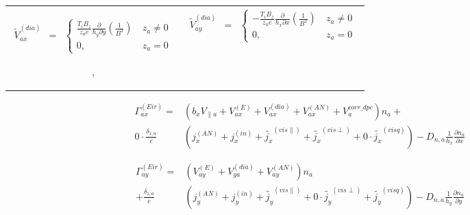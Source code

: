 \documentclass[a4paper,10pt]{report}
\begin{document}
\begin{tabular}{cc}
$\begin{matrix}
\widetilde{V}_{ax}^{(dia)} & =
& \left\{
\begin{matrix}
\frac{T_i B_z}{z_a e} \frac{\partial}{h_y \partial y} \left( \frac{1}{B^2} \right) & \ z_a \neq 0 \\
0, & \ z_a = 0
\end{matrix} \right.
\end{matrix}$

,&

$\begin{matrix}
\widetilde{V}_{ay}^{(dia)} & =
& \left\{
\begin{matrix}
-\frac{T_i B_z}{z_a e} \frac{\partial}{h_x \partial x} \left( \frac{1}{B^2} \right) & \ z_a \neq 0 \\
0, & \ z_a = 0
\end{matrix} \right.
\end{matrix}$
\end{tabular}

\begin{equation}
\begin{matrix}
\Gamma_{ax}^{\left( Eir \right)} =& \left( b_x V_{\parallel a} + V_{ax}^{\left( E \right)} + V_{ax}^{\left( dia \right)} + V_{ax}^{\left( AN \right)} + V_a^{corr\_dpc} \right) n_a + \\
0 \cdot \frac{\delta_{1,a}}{e} & \left( j_x^{\left( AN \right)} + j_x^{\left( in \right)} + \widetilde{j_x}^{\left( vis \parallel \right)} + \widetilde{j_x}^{\left( vis \perp \right)} + 0 \cdot \widetilde{j_x}^{\left( visq \right)} \right) - D_{n,a} \frac{1}{h_x} \frac{\partial n_a}{\partial x}
\end{matrix}
\end{equation}

\begin{equation}
\begin{matrix}
\Gamma_{ay}^{\left( Eir \right)} =& \left( V_{ay}^{\left( E \right)} + V_{ya}^{\left( dia \right)} + V_{ay}^{\left( AN \right)} \right) n_a \\
+ \frac{\delta_{1,a}}{e} & \left( j_y^{\left( AN \right)} + j_y^{\left( in \right)} + \widetilde{j_y}^{\left( vis \parallel \right)} + 0 \cdot \widetilde{j_y}^{\left( vis \perp \right)} + \widetilde{j_y}^{\left( visq \right)} \right) - D_{n,a} \frac{1}{h_y} \frac{\partial n_a}{\partial y}
\end{matrix}
\end{equation}
\end{document}
